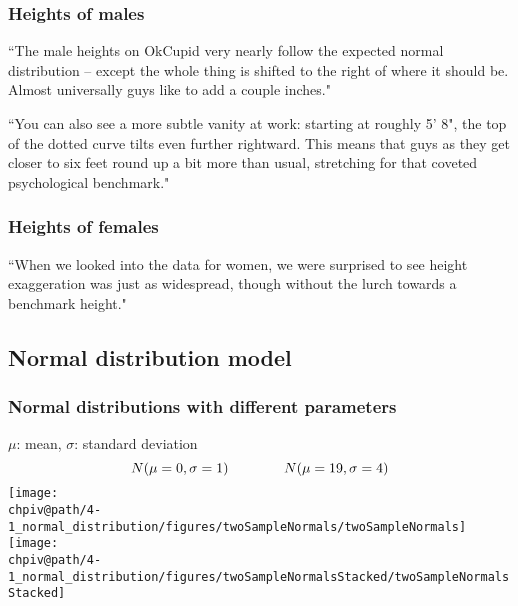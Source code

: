 \documentclass[slidestop,compress,mathserif]{beamer}
\makeatletter
\def\chpiv@path{../../Chp 4}
\makeatother
\begin{document}

\begin{frame}
\frametitle{Heights of males}

{
\pause
{\footnotesize``The male heights on OkCupid very nearly follow the expected normal distribution -- except the whole thing is shifted to the right of where it should be. Almost universally guys like to add a couple inches." 

``You can also see a more subtle vanity at work: starting at roughly 5' 8", the top of the dotted curve tilts even further rightward. This means that guys as they get closer to six feet round up a bit more than usual, stretching for that coveted psychological benchmark."
}
}


\end{frame}


\begin{frame}
\frametitle{Heights of females}

{
\pause
{\footnotesize ``When we looked into the data for women, we were surprised to see height exaggeration was just as widespread, though without the lurch towards a benchmark height."
}
}

\vfill


\end{frame}


\subsection{Normal distribution model}


\begin{frame}
\frametitle{Normal distributions with different parameters}

\vspace{-0.5cm}
\begin{center}
$\mu$: mean, $\sigma$: standard deviation
\[N(\mu = 0, \sigma = 1) \hspace{1.4cm} N(\mu = 19, \sigma = 4) \]
\texttt{[image: \\chpiv@path/4-1\_normal\_distribution/figures/twoSampleNormals/twoSampleNormals]} \\
\texttt{[image: \\chpiv@path/4-1\_normal\_distribution/figures/twoSampleNormalsStacked/twoSampleNormalsStacked]}
\end{center}

\end{frame}
\end{document}
